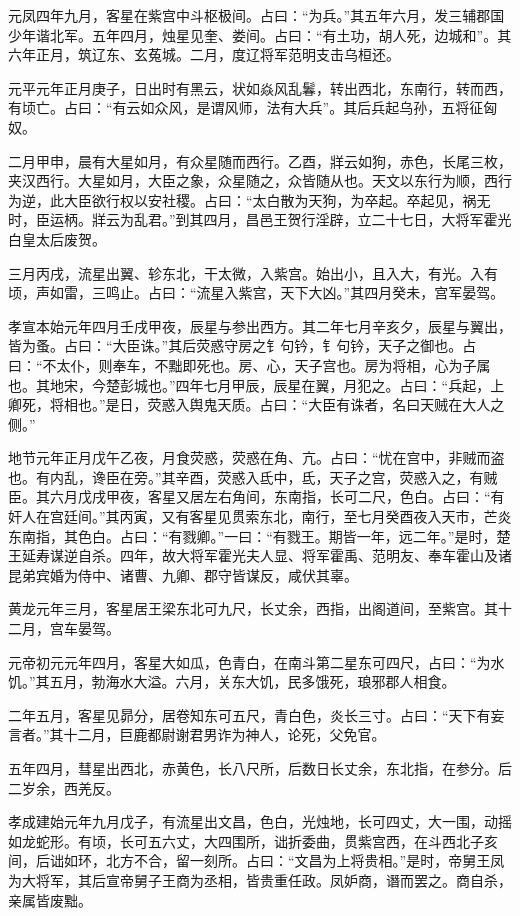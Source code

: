 \documentclass[]{article}
\begin{document}
元凤四年九月，客星在紫宫中斗枢极间。占曰：``为兵。''其五年六月，发三辅郡国少年谐北军。五年四月，烛星见奎、娄间。占曰：``有土功，胡人死，边城和''。其六年正月，筑辽东、玄菟城。二月，度辽将军范明支击乌桓还。

元平元年正月庚子，日出时有黑云，状如焱风乱鬊，转出西北，东南行，转而西，有顷亡。占曰：``有云如众风，是谓风师，法有大兵''。其后兵起乌孙，五将征匈奴。

二月甲申，晨有大星如月，有众星随而西行。乙酉，牂云如狗，赤色，长尾三枚，夹汉西行。大星如月，大臣之象，众星随之，众皆随从也。天文以东行为顺，西行为逆，此大臣欲行权以安社稷。占曰：``太白散为天狗，为卒起。卒起见，祸无时，臣运柄。牂云为乱君。''到其四月，昌邑王贺行淫辟，立二十七日，大将军霍光白皇太后废贺。

三月丙戌，流星出翼、轸东北，干太微，入紫宫。始出小，且入大，有光。入有顷，声如雷，三鸣止。占曰：``流星入紫宫，天下大凶。''其四月癸未，宫军晏驾。

孝宣本始元年四月壬戌甲夜，辰星与参出西方。其二年七月辛亥夕，辰星与翼出，皆为蚤。占曰：``大臣诛。''其后荧惑守房之钅句钤，钅句钤，天子之御也。占曰：``不太仆，则奉车，不黜即死也。房、心，天子宫也。房为将相，心为子属也。其地宋，今楚彭城也。''四年七月甲辰，辰星在翼，月犯之。占曰：``兵起，上卿死，将相也。''是日，荧惑入舆鬼天质。占曰：``大臣有诛者，名曰天贼在大人之侧。''

地节元年正月戊午乙夜，月食荧惑，荧惑在角、亢。占曰：``忧在宫中，非贼而盗也。有内乱，谗臣在旁。''其辛酉，荧惑入氐中，氐，天子之宫，荧惑入之，有贼臣。其六月戊戌甲夜，客星又居左右角间，东南指，长可二尺，色白。占曰：``有奸人在宫廷间。''其丙寅，又有客星见贯索东北，南行，至七月癸酉夜入天市，芒炎东南指，其色白。占曰：``有戮卿。''一曰：``有戮王。期皆一年，远二年。''是时，楚王延寿谋逆自杀。四年，故大将军霍光夫人显、将军霍禹、范明友、奉车霍山及诸昆弟宾婚为侍中、诸曹、九卿、郡守皆谋反，咸伏其辜。

黄龙元年三月，客星居王梁东北可九尺，长丈余，西指，出阁道间，至紫宫。其十二月，宫车晏驾。

元帝初元元年四月，客星大如瓜，色青白，在南斗第二星东可四尺，占曰：``为水饥。''其五月，勃海水大溢。六月，关东大饥，民多饿死，琅邪郡人相食。

二年五月，客星见昴分，居卷知东可五尺，青白色，炎长三寸。占曰：``天下有妄言者。''其十二月，巨鹿都尉谢君男诈为神人，论死，父免官。

五年四月，彗星出西北，赤黄色，长八尺所，后数日长丈余，东北指，在参分。后二岁余，西羌反。

孝成建始元年九月戊子，有流星出文昌，色白，光烛地，长可四丈，大一围，动摇如龙蛇形。有顷，长可五六丈，大四围所，诎折委曲，贯紫宫西，在斗西北子亥间，后诎如环，北方不合，留一刻所。占曰：``文昌为上将贵相。''是时，帝舅王凤为大将军，其后宣帝舅子王商为丞相，皆贵重任政。凤妒商，谮而罢之。商自杀，亲属皆废黜。
\end{document}
